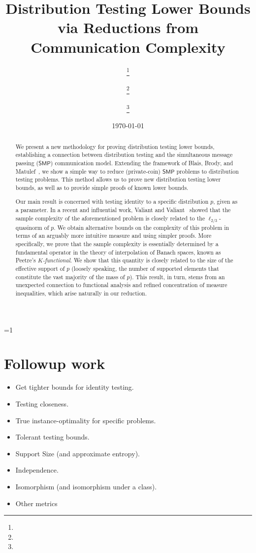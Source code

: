 \documentclass[11pt]{article}
\title{Distribution Testing Lower Bounds via Reductions from Communication Complexity}
\date{\today}
\author{
  \ecolor{\authornameeb}\thanks{\authoraffieb}
  \and \ccolor{\authornamecc}\thanks{\authorafficc}
  \and \tcolor{\authornametg}\thanks{\authoraffitg}
}
\def\withnotes{0}
\theoremstyle{remark}   	\newtheorem{remark}[theorem]{Remark}
\theoremstyle{definition}   	\newaliascnt{defn}{theorem}
\newcommand{\lp}[1][1]{\ell_{#1}}
\newcommand{\SMP}{\ensuremath{\mathsf{SMP}}}
\begin{document}
\maketitle

\begin{abstract}
    We present a new methodology for proving distribution testing lower bounds, establishing a connection between distribution testing and the simultaneous message passing ($\SMP$) communication model. Extending the framework of Blais, Brody, and Matulef~\cite{BBM12}, we show a simple way to reduce (private-coin) $\SMP$ problems to distribution testing problems. This method allows us to prove new distribution testing lower bounds, as well as to provide simple proofs of known lower bounds.

Our main result is concerned with testing identity to a specific distribution $p$, given as a parameter. In a recent and influential work, Valiant and Valiant~\cite{VV:14} showed that the sample complexity of the aforementioned problem is closely related to the $\lp[2/3]$-quasinorm of $p$. We obtain alternative bounds on the complexity of this problem in terms of an arguably more intuitive measure and using simpler proofs. 
More specifically, we prove that the sample complexity is essentially determined by a fundamental operator in the theory of interpolation of Banach spaces, known as Peetre's \emph{$K$-functional}. We show that this quantity is closely related to the size of the effective support of $p$ (loosely speaking, the number of supported elements that constitute the vast majority of the mass of $p$).
This result, in turn, stems from an unexpected connection to functional analysis and refined concentration of measure inequalities, which arise naturally in our reduction.
 \end{abstract}

\ifnum\withnotes=1
  \clearpage
  \listoftodos
  \hfill
  \section*{Followup work}
  \begin{itemize}
  \item Get tighter bounds for identity testing.
  \item Testing closeness.
  \item True instance-optimality for specific problems.
  \item Tolerant testing bounds.
  \item Support Size (and approximate entropy).
  \item Independence.
  \item Isomorphism (and isomorphism under a class).
  \item Other metrics
  \end{itemize}
  \newpage
  \tableofcontents
  \clearpage
\fi
\end{document}
